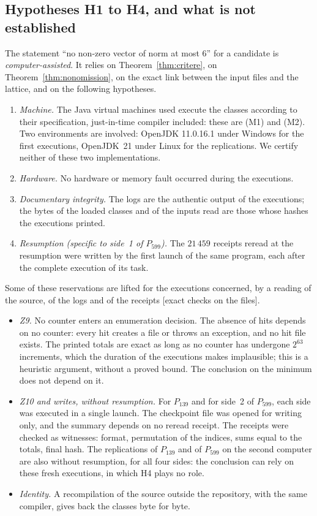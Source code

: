 \documentclass[11pt,a4paper]{amsart}
\theoremstyle{plain}
\theoremstyle{definition}
\numberwithin{equation}{section}
\newcommand{\st}[1]{\textup{\textsf{\small[#1]}}}
\begin{document}
\subsection{Hypotheses H1 to H4, and what is not established}\label{subsec:hyp}
The statement ``no non-zero vector of norm at most $6$'' for a candidate is \emph{computer-assisted}. It relies on Theorem~\ref{thm:critere}, on Theorem~\ref{thm:nonomission}, on the exact link between the input files and the lattice, and on the following hypotheses.
\begin{enumerate}[label=\textup{(H\arabic*)}]
\item \emph{Machine.} The Java virtual machines used execute the classes according to their specification, just-in-time compiler included: these are (M1) and (M2). Two environments are involved: OpenJDK 11.0.16.1 under Windows for the first executions, OpenJDK~21 under Linux for the replications. We certify neither of these two implementations.
\item \emph{Hardware.} No hardware or memory fault occurred during the executions.
\item \emph{Documentary integrity.} The logs are the authentic output of the executions; the bytes of the loaded classes and of the inputs read are those whose hashes the executions printed.
\item \emph{Resumption (specific to side~1 of $P_{599}$).} The $21\,459$ receipts reread at the resumption were written by the first launch of the same program, each after the complete execution of its task.
\end{enumerate}

Some of these reservations are lifted for the executions concerned, by a reading of the source, of the logs and of the receipts \st{exact checks on the files}.
\begin{itemize}
\item \emph{Z9.} No counter enters an enumeration decision. The absence of hits depends on no counter: every hit creates a file or throws an exception, and no hit file exists. The printed totals are exact as long as no counter has undergone $2^{63}$ increments, which the duration of the executions makes implausible; this is a heuristic argument, without a proved bound. The conclusion on the minimum does not depend on it.
\item \emph{Z10 and writes, without resumption.} For $P_{139}$ and for side~2 of $P_{599}$, each side was executed in a single launch. The checkpoint file was opened for writing only, and the summary depends on no reread receipt. The receipts were checked as witnesses: format, permutation of the indices, sums equal to the totals, final hash. The replications of $P_{139}$ and of $P_{599}$ on the second computer are also without resumption, for all four sides: the conclusion can rely on these fresh executions, in which H4 plays no role.
\item \emph{Identity.} A recompilation of the source outside the repository, with the same compiler, gives back the classes byte for byte.
\end{itemize}
\end{document}
